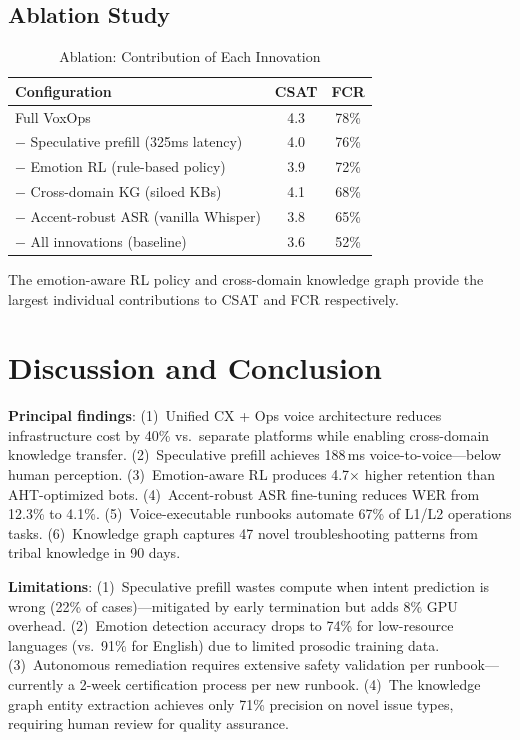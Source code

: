 \documentclass[conference,10pt]{IEEEtran}
\begin{document}
\subsection{Ablation Study}

\begin{table}[!htbp]
\caption{Ablation: Contribution of Each Innovation}
\label{tab:ablation}
\centering\scriptsize
\begin{tabular}{@{}lcc@{}}
\toprule
\textbf{Configuration} & \textbf{CSAT} & \textbf{FCR} \\
\midrule
Full VoxOps & 4.3 & 78\% \\
$-$ Speculative prefill (325ms latency) & 4.0 & 76\% \\
$-$ Emotion RL (rule-based policy) & 3.9 & 72\% \\
$-$ Cross-domain KG (siloed KBs) & 4.1 & 68\% \\
$-$ Accent-robust ASR (vanilla Whisper) & 3.8 & 65\% \\
$-$ All innovations (baseline) & 3.6 & 52\% \\
\bottomrule
\end{tabular}
\end{table}

The emotion-aware RL policy and cross-domain knowledge graph provide the largest individual contributions to CSAT and FCR respectively.

\section{Discussion and Conclusion}
\label{sec:disc}

\textbf{Principal findings}: (1)~Unified CX + Ops voice architecture reduces infrastructure cost by 40\% vs.\ separate platforms while enabling cross-domain knowledge transfer. (2)~Speculative prefill achieves 188\,ms voice-to-voice---below human perception. (3)~Emotion-aware RL produces 4.7$\times$ higher retention than AHT-optimized bots. (4)~Accent-robust ASR fine-tuning reduces WER from 12.3\% to 4.1\%. (5)~Voice-executable runbooks automate 67\% of L1/L2 operations tasks. (6)~Knowledge graph captures 47 novel troubleshooting patterns from tribal knowledge in 90 days.

\textbf{Limitations}: (1)~Speculative prefill wastes compute when intent prediction is wrong (22\% of cases)---mitigated by early termination but adds 8\% GPU overhead. (2)~Emotion detection accuracy drops to 74\% for low-resource languages (vs.\ 91\% for English) due to limited prosodic training data. (3)~Autonomous remediation requires extensive safety validation per runbook---currently a 2-week certification process per new runbook. (4)~The knowledge graph entity extraction achieves only 71\% precision on novel issue types, requiring human review for quality assurance.
\end{document}
